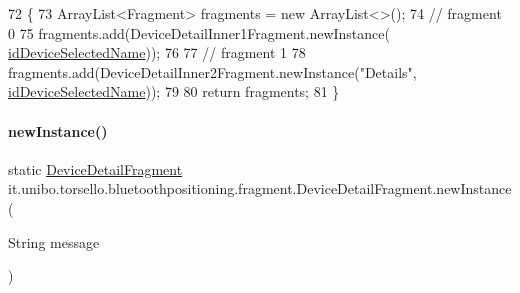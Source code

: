 \begin{DoxyCode}
72                                                \{
73         ArrayList<Fragment> fragments = \textcolor{keyword}{new} ArrayList<>();
74         \textcolor{comment}{// fragment 0}
75         fragments.add(DeviceDetailInner1Fragment.newInstance(
      \hyperlink{classit_1_1unibo_1_1torsello_1_1bluetoothpositioning_1_1fragment_1_1DeviceDetailFragment_a6d52d8371a07fb8da75879758d1d6942_a6d52d8371a07fb8da75879758d1d6942}{idDeviceSelectedName}));
76 
77         \textcolor{comment}{// fragment 1}
78         fragments.add(DeviceDetailInner2Fragment.newInstance(\textcolor{stringliteral}{"Details"}, 
      \hyperlink{classit_1_1unibo_1_1torsello_1_1bluetoothpositioning_1_1fragment_1_1DeviceDetailFragment_a6d52d8371a07fb8da75879758d1d6942_a6d52d8371a07fb8da75879758d1d6942}{idDeviceSelectedName}));
79 
80         \textcolor{keywordflow}{return} fragments;
81     \}
\end{DoxyCode}
\hypertarget{classit_1_1unibo_1_1torsello_1_1bluetoothpositioning_1_1fragment_1_1DeviceDetailFragment_a626de18d36d44ae0b4ff21c2527bdf5a_a626de18d36d44ae0b4ff21c2527bdf5a}{}\label{classit_1_1unibo_1_1torsello_1_1bluetoothpositioning_1_1fragment_1_1DeviceDetailFragment_a626de18d36d44ae0b4ff21c2527bdf5a_a626de18d36d44ae0b4ff21c2527bdf5a} 
\paragraph{\texorpdfstring{new\+Instance()}{newInstance()}}
{\footnotesize\ttfamily static \hyperlink{classit_1_1unibo_1_1torsello_1_1bluetoothpositioning_1_1fragment_1_1DeviceDetailFragment}{Device\+Detail\+Fragment} it.\+unibo.\+torsello.\+bluetoothpositioning.\+fragment.\+Device\+Detail\+Fragment.\+new\+Instance (\begin{DoxyParamCaption}\item[{String}]{message }\end{DoxyParamCaption})\hspace{0.3cm}{\ttfamily [static]}}


